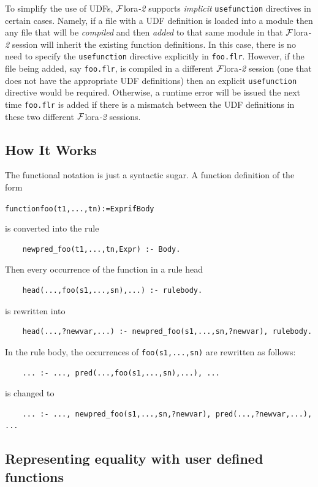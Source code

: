 \documentclass[11pt]{article}
\newcommand{\FLORA}{{\mbox{\sc ${\cal F}${lora}\rm\emph{-2}}}\xspace}
\begin{document}
To simplify the use of UDFs, \FLORA supports \emph{implicit}
\texttt{usefunction} directives in certain cases. Namely, if a file with
a UDF definition is loaded into a module then any file that will be
\emph{compiled} and then \emph{added} to that same module in that \FLORA session
will inherit the existing function definitions. In this case, there is no
need to specify the \texttt{usefunction} directive explicitly in
\texttt{foo.flr}.
However, if the file being added, say \texttt{foo.flr},
is compiled in a different \FLORA session
(one that does not have the appropriate UDF definitions) then an explicit
\texttt{usefunction} directive would be required. Otherwise, a runtime
error will be issued the next time \texttt{foo.flr} is added if there is a
mismatch between the UDF definitions in these two different \FLORA sessions. 


\subsection{How It Works}

The functional notation is just a syntactic sugar. A function definition
of the form
\begin{alltt}
    function foo(t1,...,tn) := Expr if Body
\end{alltt}
is converted into the rule
\begin{verbatim}
    newpred_foo(t1,...,tn,Expr) :- Body.
\end{verbatim}
Then every occurrence of the function in a rule head
\begin{verbatim}
    head(...,foo(s1,...,sn),...) :- rulebody.
\end{verbatim}
is rewritten into
\begin{verbatim}
    head(...,?newvar,...) :- newpred_foo(s1,...,sn,?newvar), rulebody.
\end{verbatim}
In the rule body, the occurrences of \texttt{foo(s1,...,sn)}  are rewritten as
follows:
\begin{verbatim}
    ... :- ..., pred(...,foo(s1,...,sn),...), ...
\end{verbatim}
is changed to
\begin{verbatim}
    ... :- ..., newpred_foo(s1,...,sn,?newvar), pred(...,?newvar,...), ...
\end{verbatim}


\subsection{Representing equality with user defined functions}
\end{document}
